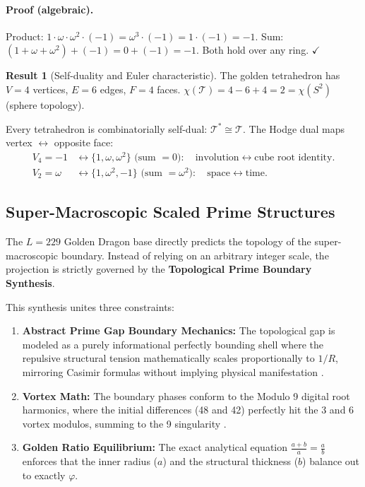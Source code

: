 \documentclass[12pt,oneside]{article}
\theoremstyle{principia}
\theoremstyle{definition}
\newtheorem{result}[theorem]{Result}
\theoremstyle{remark}
\begin{document}
\paragraph{Proof (algebraic).}
Product: $1 \cdot \omega \cdot \omega^2 \cdot (-1)
= \omega^3 \cdot (-1) = 1 \cdot (-1) = -1$.
Sum: $(1 + \omega + \omega^2) + (-1) = 0 + (-1) = -1$.
Both hold over any ring. $\checkmark$

\begin{result}[Self-duality and Euler characteristic]
The golden tetrahedron has $V = 4$ vertices, $E = 6$ edges,
$F = 4$ faces.
$\chi(\mathcal{T}) = 4 - 6 + 4 = 2 = \chi(S^2)$ (sphere topology).

Every tetrahedron is combinatorially self-dual: $\mathcal{T}^* \cong \mathcal{T}$.
The Hodge dual maps vertex $\leftrightarrow$ opposite face:
\begin{align}
  V_4 = -1 &\longleftrightarrow \{1, \omega, \omega^2\} \text{ (sum } = 0\text{)}: \quad
    \text{involution} \leftrightarrow \text{cube root identity.} \\
  V_2 = \omega &\longleftrightarrow \{1, \omega^2, -1\} \text{ (sum } = \omega^2\text{)}: \quad
    \text{space} \leftrightarrow \text{time.}
\end{align}
\end{result}

\subsection{Super-Macroscopic Scaled Prime Structures}
\label{sec:super_macro_scaled}

The $L=229$ Golden Dragon base directly predicts the topology of the super-macroscopic boundary. Instead of relying on an arbitrary integer scale, the projection is strictly governed by the \textbf{Topological Prime Boundary Synthesis}. 

This synthesis unites three constraints:
\begin{enumerate}
    \item \textbf{Abstract Prime Gap Boundary Mechanics:} The topological gap is modeled as a purely informational perfectly bounding shell where the repulsive structural tension mathematically scales proportionally to $1/R$, mirroring Casimir formulas without implying physical manifestation \cite{lockwood_zpe2025}.
    \item \textbf{Vortex Math:} The boundary phases conform to the Modulo 9 digital root harmonics, where the initial differences (48 and 42) perfectly hit the 3 and 6 vortex modulos, summing to the 9 singularity \cite{larue_chromatic}.
    \item \textbf{Golden Ratio Equilibrium:} The exact analytical equation $\frac{a+b}{a} = \frac{a}{b}$ enforces that the inner radius ($a$) and the structural thickness ($b$) balance out to exactly $\varphi$.
\end{enumerate}
\end{document}
